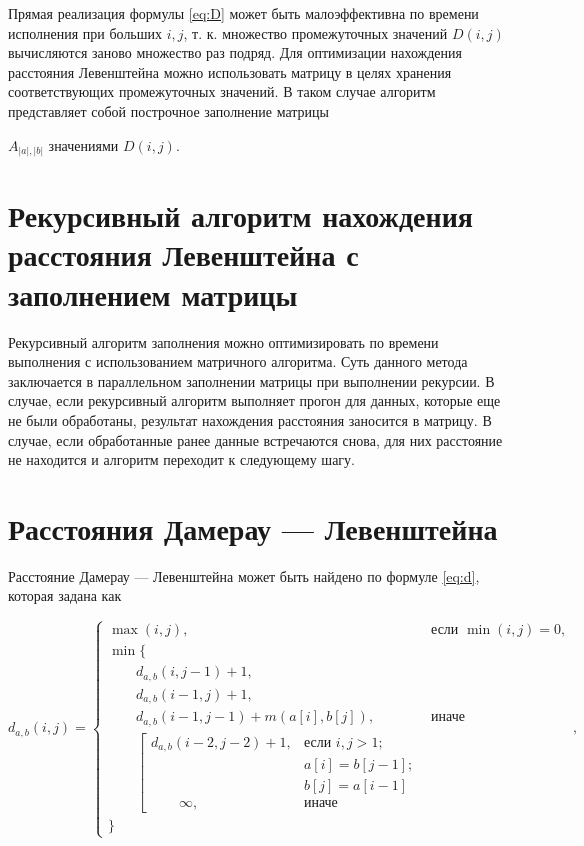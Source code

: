 Прямая реализация формулы \eqref{eq:D} может быть малоэффективна по времени исполнения при больших $i, j$,
т. к. множество промежуточных значений $D(i, j)$ вычисляются заново множество раз подряд.
Для оптимизации нахождения расстояния Левенштейна можно использовать матрицу в целях хранения соответствующих промежуточных значений.
В таком случае алгоритм представляет собой построчное заполнение матрицы

$A_{|a|,|b|}$ значениями $D(i, j)$.

\section{Рекурсивный алгоритм нахождения расстояния Левенштейна с заполнением матрицы}

\label{sec:recmat}

Рекурсивный алгоритм заполнения можно оптимизировать по времени выполнения с использованием матричного алгоритма.
Суть данного метода заключается в параллельном заполнении матрицы при выполнении рекурсии.
В случае, если рекурсивный алгоритм выполняет прогон для данных, которые еще не были обработаны,
результат нахождения расстояния заносится в матрицу.
В случае, если обработанные ранее данные встречаются снова, для них расстояние не находится и алгоритм переходит к следующему шагу.

\section{Расстояния Дамерау — Левенштейна}

Расстояние Дамерау — Левенштейна может быть найдено по формуле \eqref{eq:d}, которая задана как

\begin{equation}
    \label{eq:d}
    d_{a,b}(i, j) = \begin{cases}
                        \max(i, j), &\text{если }\min(i, j) = 0,\\
                        \min \lbrace \\
                        \qquad d_{a,b}(i, j-1) + 1,\\
                        \qquad d_{a,b}(i-1, j) + 1,\\
                        \qquad d_{a,b}(i-1, j-1) + m(a[i], b[j]), &\text{иначе}\\
                        \qquad \left[ \begin{array}{cc}d_{a,b}(i-2, j-2) + 1, &\text{если }i,j > 1;\\
                        \qquad &\text{}a[i] = b[j-1]; \\
                        \qquad &\text{}b[j] = a[i-1]\\
                        \qquad \infty, & \text{иначе}\end{array}\right.\\
                        \rbrace
    \end{cases},
\end{equation}

